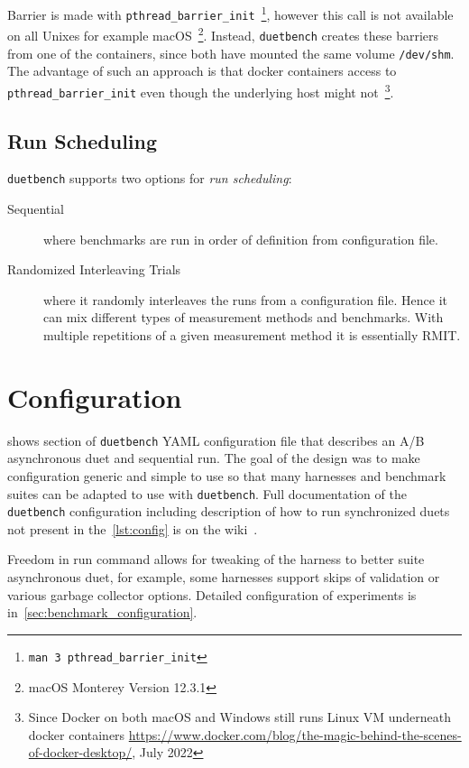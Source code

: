 Barrier is made with \lstinline{pthread_barrier_init}~\footnote{\lstinline{man 3 pthread_barrier_init}}, however this call is not available on all Unixes for example macOS~\footnote{macOS Monterey Version 12.3.1}.
Instead, \lstinline{duetbench} creates these barriers from one of the containers, since both have mounted the same volume \lstinline{/dev/shm}.
The advantage of such an approach is that docker containers access to \lstinline{pthread_barrier_init} even though the underlying host might not~\footnote{Since Docker on both macOS and Windows still runs Linux VM underneath docker containers \url{https://www.docker.com/blog/the-magic-behind-the-scenes-of-docker-desktop/}, July 2022}.

\subsection{Run Scheduling}
\label{sec:scheduling}

\lstinline{duetbench} supports two options for \emph{run scheduling}:
\begin{description}
    \item[Sequential] where benchmarks are run in order of definition from configuration file.
    \item[Randomized Interleaving Trials] where it randomly interleaves the runs from a configuration file.
        Hence it can mix different types of measurement methods and benchmarks.
        With multiple repetitions of a given measurement method it is essentially RMIT\cite{abedi2017conducting}.
\end{description}

\section{Configuration}
\label{sec:configuration}

 shows section of \lstinline{duetbench} YAML configuration file that describes an A/B asynchronous duet and sequential run.
The goal of the design was to make configuration generic and simple to use so that many harnesses and benchmark suites can be adapted to use with \lstinline{duetbench}.
Full documentation of the \lstinline{duetbench} configuration including description of how to run synchronized duets not present in the~\cref{lst:config} is on the wiki~\cite{wiki}.

Freedom in run command allows for tweaking of the harness to better suite asynchronous duet, for example, some harnesses support skips of validation or various garbage collector options.
Detailed configuration of experiments is in~\cref{sec:benchmark_configuration}.

